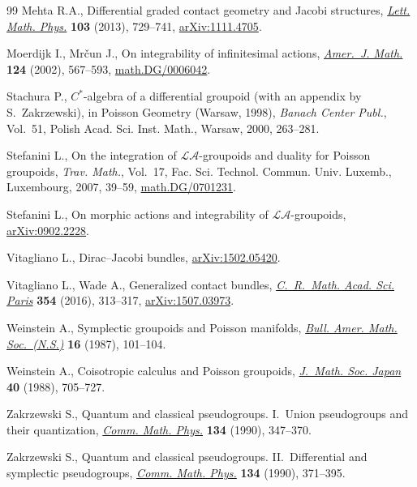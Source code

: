 \documentclass[pdftex]{sigma}
\numberwithin{equation}{section}
\begin{document}
\begin{thebibliography}{99}
Mehta R.A., Dif\/ferential graded contact geometry and {J}acobi structures,
 \href{https://doi.org/10.1007/s11005-013-0609-6}{\textit{Lett. Math. Phys.}} \textbf{103} (2013), 729--741, \href{https://arxiv.org/abs/1111.4705}{arXiv:1111.4705}.

Moerdijk I., Mr\v{c}un J., On integrability of inf\/initesimal actions,
 \href{https://doi.org/10.1353/ajm.2002.0019}{\textit{Amer.~J. Math.}} \textbf{124} (2002), 567--593,
 \href{https://arxiv.org/abs/math.DG/0006042}{math.DG/0006042}.

Stachura P., {$C^*$}-algebra of a dif\/ferential groupoid (with an appendix by
 {S}.~{Z}akrzewski), in Poisson Geometry ({W}arsaw, 1998), \textit{Banach
 Center Publ.}, Vol.~51, Polish Acad. Sci. Inst. Math., Warsaw, 2000,
 263--281.


Stefanini L., On the integration of {$\mathcal{LA}$}-groupoids and duality for
 {P}oisson groupoids, \textit{Trav. Math.}, Vol.~17, Fac. Sci. Technol. Commun. Univ. Luxemb., Luxembourg,
 2007, 39--59, \href{https://arxiv.org/abs/math.DG/0701231}{math.DG/0701231}.

Stefanini L., On morphic actions and integrability of $\mathcal{LA}$-groupoids,
 \href{https://arxiv.org/abs/0902.2228}{arXiv:0902.2228}.

Vitagliano L., Dirac--{J}acobi bundles, \href{https://arxiv.org/abs/1502.05420}{arXiv:1502.05420}.

Vitagliano L., Wade A., Generalized contact bundles, \href{https://doi.org/10.1016/j.crma.2015.12.009}{\textit{C.~R.~Math. Acad.
 Sci. Paris}} \textbf{354} (2016), 313--317, \href{https://arxiv.org/abs/1507.03973}{arXiv:1507.03973}.

Weinstein A., Symplectic groupoids and {P}oisson manifolds, \href{https://doi.org/10.1090/S0273-0979-1987-15473-5}{\textit{Bull. Amer.
 Math. Soc.~(N.S.)}} \textbf{16} (1987), 101--104.

Weinstein A., Coisotropic calculus and {P}oisson groupoids, \href{https://doi.org/10.2969/jmsj/04040705}{\textit{J.~Math.
 Soc. Japan}} \textbf{40} (1988), 705--727.

Zakrzewski S., Quantum and classical pseudogroups. {I}.~{U}nion pseudogroups
 and their quantization, \href{https://doi.org/10.1007/bf02097706}{\textit{Comm. Math. Phys.}} \textbf{134} (1990),
 347--370.

Zakrzewski S., Quantum and classical pseudogroups. {II}.~{D}if\/ferential and
 symplectic pseudogroups, \href{https://doi.org/10.1007/bf02097707}{\textit{Comm. Math. Phys.}} \textbf{134} (1990),
 371--395.

\end{thebibliography}\LastPageEnding
\end{document}
